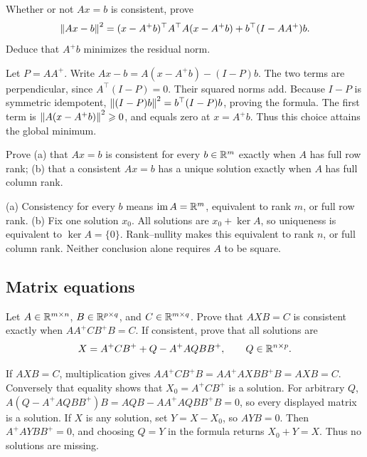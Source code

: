 \begin{problem}\label{ex:10:ls-identity}
Whether or not \(Ax=b\) is consistent, prove
\[
\left\lVert Ax-b\right\rVert^2=(x-A^+b)^\top A^\top A(x-A^+b)
+b^\top(I-AA^+)b.
\]
Deduce that \(A^+b\) minimizes the residual norm.
\end{problem}
\begin{solution}
Let \(P=AA^+\). Write
\(Ax-b=A(x-A^+b)-(I-P)b\).
The two terms are perpendicular, since \(A^\top(I-P)=0\).
Their squared norms add. Because \(I-P\) is symmetric idempotent,
\(\left\lVert(I-P)b\right\rVert^2=b^\top(I-P)b\), proving the formula.
The first term is \(\left\lVert A(x-A^+b)\right\rVert^2\geqslant0\), and equals zero
at \(x=A^+b\). Thus this choice attains the global minimum.
\end{solution}

\begin{problem}\label{ex:10:surjective-injective}
Prove (a) that \(Ax=b\) is consistent for every \(b\in\mathbb R^m\) exactly
when \(A\) has full row rank; (b) that a consistent \(Ax=b\) has a
unique solution exactly when \(A\) has full column rank.
\end{problem}
\begin{solution}
(a) Consistency for every \(b\) means \(\operatorname{im}A=\mathbb R^m\),
equivalent to rank \(m\), or full row rank.
(b) Fix one solution \(x_0\). All solutions are \(x_0+\ker A\), so
uniqueness is equivalent to \(\ker A=\{0\}\). Rank–nullity makes this
equivalent to rank \(n\), or full column rank. Neither conclusion alone
requires \(A\) to be square.
\end{solution}

\subsection*{Matrix equations}

\begin{problem}\label{ex:10:matrix-all}
Let \(A\in\mathbb R^{m\times n}\), \(B\in\mathbb R^{p\times q}\), and
\(C\in\mathbb R^{m\times q}\). Prove that \(AXB=C\) is consistent exactly
when \(AA^+CB^+B=C\). If consistent, prove that all solutions are
\[
X=A^+CB^++Q-A^+AQBB^+,\qquad Q\in\mathbb R^{n\times p}.
\]
\end{problem}
\begin{solution}
If \(AXB=C\), multiplication gives
\(AA^+CB^+B=AA^+AXB B^+B=AXB=C\).
Conversely that equality shows that \(X_0=A^+CB^+\) is a solution.
For arbitrary \(Q\),
\(A(Q-A^+AQBB^+)B=AQB-AA^+AQBB^+B=0\),
so every displayed matrix is a solution.
If \(X\) is any solution, set \(Y=X-X_0\), so \(AYB=0\).
Then \(A^+AYBB^+=0\), and choosing \(Q=Y\) in the formula returns
\(X_0+Y=X\). Thus no solutions are missing.
\end{solution}

